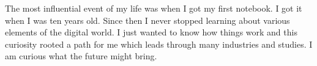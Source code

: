 \documentclass[9pt]{developercv} %
\begin{document}
\vspace{0.5cm}



\begin{minipage}[t]{0.4\textwidth} %
	\vspace{-\baselineskip} %
	The most influential event of my life was when I got my first notebook. I got it when I was ten years old. Since then I never stopped learning about various elements of the digital world. I just wanted to know how things work and this curiosity rooted a path for me which leads through many industries and studies. I am curious what the future might bring.
\end{minipage}
\hfill %
\begin{minipage}[t]{0.5\textwidth} %
	\vspace{-\baselineskip} %
	\skillschart
\end{minipage}

\toolbubbles


\end{document}
